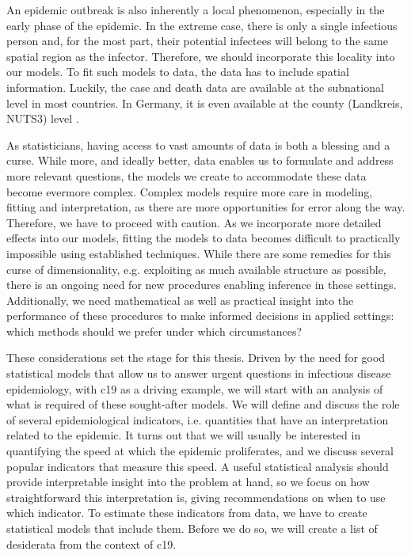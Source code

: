 An epidemic outbreak is also inherently a local phenomenon, especially in the early phase of the epidemic. In the extreme case, there is only a single infectious person and, for the most part, their potential infectees will belong to the same spatial region as the infector. Therefore, we should incorporate this locality into our models. To fit such models to data, the data has to include spatial information. Luckily, the case and death data are available at the subnational level in most countries. In Germany, it is even available at the county (Landkreis, NUTS3) level \citep{RobertKoch-Institut2022SARSCoV2}. 

As statisticians, having access to vast amounts of data is both a blessing and a curse. While more, and ideally better, data enables us to formulate and address more relevant questions, the models we create to accommodate these data become evermore complex. Complex models require more care in modeling, fitting and interpretation, as there are more opportunities for error along the way. Therefore, we have to proceed with caution. As we incorporate more detailed effects into our models, fitting the models to data becomes difficult to practically impossible using established techniques. While there are some remedies for this curse of dimensionality, e.g. exploiting as much available structure as possible, there is an ongoing need for new procedures enabling inference in these settings. Additionally, we need mathematical as well as practical insight into the performance of these procedures to make informed decisions in applied settings: which methods should we prefer under which circumstances?

These considerations set the stage for this thesis. Driven by the need for good statistical models that allow us to answer urgent questions in infectious disease epidemiology, with \acrshort{c19} as a driving example, we will start with an analysis of what is required of these sought-after models. We will define and discuss the role of several epidemiological indicators, i.e. quantities that have an interpretation related to the epidemic. It turns out that we will usually be interested in quantifying the speed at which the epidemic proliferates, and we discuss several popular indicators that measure this speed. A useful statistical analysis should provide interpretable insight into the problem at hand, so we focus on how straightforward this interpretation is, giving recommendations on when to use which indicator. To estimate these indicators from data, we have to create statistical models that include them. Before we do so, we will create a list of desiderata from the context of \acrshort{c19}. 

